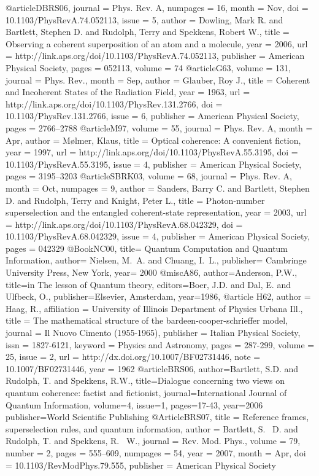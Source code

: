 @article{DBRS06,
  journal = {Phys. Rev. A},
  numpages = {16},
  month = {Nov},
  doi = {10.1103/PhysRevA.74.052113},
  issue = {5},
  author = {Dowling, Mark R. and Bartlett, Stephen D. and Rudolph, Terry and Spekkens, Robert W.},
  title = {Observing a coherent superposition of an atom and a molecule},
  year = {2006},
  url = {http://link.aps.org/doi/10.1103/PhysRevA.74.052113},
  publisher = {American Physical Society},
  pages = {052113},
  volume = {74}
}
@article{G63,
  volume = {131},
  journal = {Phys. Rev.},
  month = {Sep},
  author = {Glauber, Roy J.},
  title = {Coherent and Incoherent States of the Radiation Field},
  year = {1963},
  url = {http://link.aps.org/doi/10.1103/PhysRev.131.2766},
  doi = {10.1103/PhysRev.131.2766},
  issue = {6},
  publisher = {American Physical Society},
  pages = {2766--2788}
}
@article{M97,
  volume = {55},
  journal = {Phys. Rev. A},
  month = {Apr},
  author = {M\o{}lmer, Klaus},
  title = {Optical coherence: A convenient fiction},
  year = {1997},
  url = {http://link.aps.org/doi/10.1103/PhysRevA.55.3195},
  doi = {10.1103/PhysRevA.55.3195},
  issue = {4},
  publisher = {American Physical Society},
  pages = {3195--3203}
}
@article{SBRK03,
  volume = {68},
  journal = {Phys. Rev. A},
  month = {Oct},
  numpages = {9},
  author = {Sanders, Barry C. and Bartlett, Stephen D. and Rudolph, Terry and Knight, Peter L.},
  title = {Photon-number superselection and the entangled coherent-state representation},
  year = {2003},
  url = {http://link.aps.org/doi/10.1103/PhysRevA.68.042329},
  doi = {10.1103/PhysRevA.68.042329},
  issue = {4},
  publisher = {American Physical Society},
  pages = {042329}
}
@Book{NC00,
  title= {Quantum {C}omputation and {Q}uantum {I}nformation},
  author= {Nielsen, M.~A. and Chuang, I.~L.},
  publisher= {Cambringe University Press, New York},
  year= {2000}
}
@misc{A86,
author={Anderson, P.W.},
title={in The lesson of Quantum theory},
editors={Boer, J.D. and Dal, E. and Ulfbeck, O.},
publisher={Elsevier, Amsterdam},
year={1986},
}
@article {H62,
   author = {Haag, R.},
   affiliation = {University of Illinois Department of Physics Urbana Ill.},
   title = {The mathematical structure of the bardeen-cooper-schrieffer model},
   journal = {Il Nuovo Cimento (1955-1965)},
   publisher = {Italian Physical Society},
   issn = {1827-6121},
   keyword = {Physics and Astronomy},
   pages = {287-299},
   volume = {25},
   issue = {2},
   url = {http://dx.doi.org/10.1007/BF02731446},
   note = {10.1007/BF02731446},
   year = {1962}
}
@article{BRS06,
author={Bartlett, S.D. and Rudolph, T. and Spekkens, R.W.},
title={Dialogue concerning two views on quantum coherence: factist and fictionist},
journal={International Journal of Quantum Information},
volume={4},
issue={1},
pages={17-43},
year={2006}
publisher={World Scientific Publishing}
}
@Article{BRS07,
  title = {Reference frames, superselection rules, and quantum information},
  author = {Bartlett, S.~ D. and Rudolph, T.  and Spekkens, R.~ W.},
  journal = {Rev. Mod. Phys.},
  volume = {79},
  number = {2},
  pages = {555--609},
  numpages = {54},
  year = {2007},
  month = {Apr},
  doi = {10.1103/RevModPhys.79.555},
  publisher = {American Physical Society}
}
